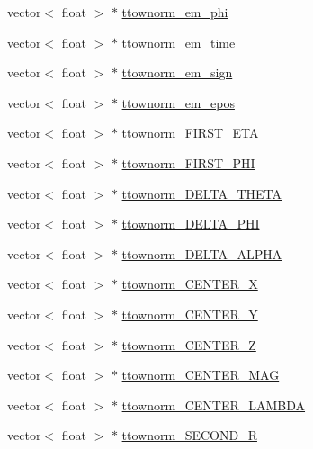 \begin{DoxyCompactItemize}
vector$<$ float $>$ $\ast$ \hyperlink{classJetAnalysisExample_ace517e62ffc102ccb569d2878de893e9}{ttownorm\+\_\+em\+\_\+phi}
\item 
vector$<$ float $>$ $\ast$ \hyperlink{classJetAnalysisExample_a95ba8fd1e56d93ec85d47f9f67d85177}{ttownorm\+\_\+em\+\_\+time}
\item 
vector$<$ float $>$ $\ast$ \hyperlink{classJetAnalysisExample_a4e679daef85abc4e6efc20b7cafc3694}{ttownorm\+\_\+em\+\_\+sign}
\item 
vector$<$ float $>$ $\ast$ \hyperlink{classJetAnalysisExample_a55aa5c534ebcccbfdfac446d6e736fd0}{ttownorm\+\_\+em\+\_\+epos}
\item 
vector$<$ float $>$ $\ast$ \hyperlink{classJetAnalysisExample_afb013042f16f1b7a057ad239b3e30a79}{ttownorm\+\_\+\+F\+I\+R\+S\+T\+\_\+\+E\+TA}
\item 
vector$<$ float $>$ $\ast$ \hyperlink{classJetAnalysisExample_ae66c2ef9ee753c2d6a53ffbdc8f3a209}{ttownorm\+\_\+\+F\+I\+R\+S\+T\+\_\+\+P\+HI}
\item 
vector$<$ float $>$ $\ast$ \hyperlink{classJetAnalysisExample_a55d8ca98c3b7c7523c3e3773ea41c2fb}{ttownorm\+\_\+\+D\+E\+L\+T\+A\+\_\+\+T\+H\+E\+TA}
\item 
vector$<$ float $>$ $\ast$ \hyperlink{classJetAnalysisExample_a14e7e855e15d65dbb5f18fdcc095bd94}{ttownorm\+\_\+\+D\+E\+L\+T\+A\+\_\+\+P\+HI}
\item 
vector$<$ float $>$ $\ast$ \hyperlink{classJetAnalysisExample_ae38b3dbe437d38c51f66c5f3d677343d}{ttownorm\+\_\+\+D\+E\+L\+T\+A\+\_\+\+A\+L\+P\+HA}
\item 
vector$<$ float $>$ $\ast$ \hyperlink{classJetAnalysisExample_aca7aeb7b8d9b2e70d7692b5276cb91f5}{ttownorm\+\_\+\+C\+E\+N\+T\+E\+R\+\_\+X}
\item 
vector$<$ float $>$ $\ast$ \hyperlink{classJetAnalysisExample_aee4262350caac720f08cb5399e424644}{ttownorm\+\_\+\+C\+E\+N\+T\+E\+R\+\_\+Y}
\item 
vector$<$ float $>$ $\ast$ \hyperlink{classJetAnalysisExample_a7a0b3a4235ace2954d3002e36784b116}{ttownorm\+\_\+\+C\+E\+N\+T\+E\+R\+\_\+Z}
\item 
vector$<$ float $>$ $\ast$ \hyperlink{classJetAnalysisExample_a8b37192f9a46bbd5ff7a9c486d741534}{ttownorm\+\_\+\+C\+E\+N\+T\+E\+R\+\_\+\+M\+AG}
\item 
vector$<$ float $>$ $\ast$ \hyperlink{classJetAnalysisExample_a4aa2db516ca5e20347e26351ffc54098}{ttownorm\+\_\+\+C\+E\+N\+T\+E\+R\+\_\+\+L\+A\+M\+B\+DA}
\item 
vector$<$ float $>$ $\ast$ \hyperlink{classJetAnalysisExample_a03a03b552de5469d9f995eaecb39c6fd}{ttownorm\+\_\+\+S\+E\+C\+O\+N\+D\+\_\+R}

\end{DoxyCompactItemize}
